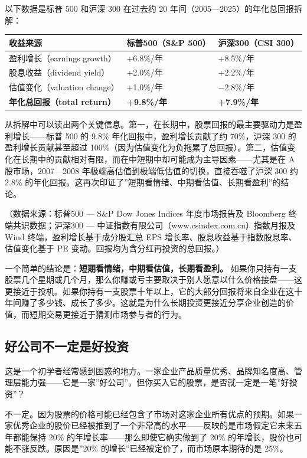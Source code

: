\documentclass[a4paper,11pt,oneside,fontset=none,UTF8,zihao=-4]{ctexbook}
\begin{document}
以下数据是标普 500 和沪深 300 在过去约 20
年间（2005---2025）的年化总回报拆解：

\begin{longtable}[]{@{}lll@{}}
\toprule\noalign{}\rowcolor{dh-pink!25}
收益来源 & 标普500（S\&P 500） & 沪深300（CSI 300） \\
\midrule\noalign{}
\endhead
\bottomrule\noalign{}
\endlastfoot
盈利增长（earnings growth） & +6.8\%/年 & +8.5\%/年 \\
股息收益（dividend yield） & +2.0\%/年 & +2.2\%/年 \\
估值变化（valuation change） & +1.0\%/年 & −2.8\%/年 \\
\textbf{年化总回报（total return）} & \textbf{+9.8\%/年} &
\textbf{+7.9\%/年} \\
\end{longtable}

从拆解中可以读出两个关键信息。第一，在长期中，股票回报的最主要驱动力是盈利增长------标普
500 的 9.8\% 年化回报中，盈利增长贡献了约 70\%，沪深 300
的盈利增长贡献甚至超过
100\%（因为估值变化为负拖累了总回报）。第二，估值变化在长期中的贡献相对有限，而在中短期中却可能成为主导因素------尤其是在
A 股市场，2007---2008 年极端高估值到极端低估值的切换，直接吞噬了沪深 300
约 2.8\%
的年化回报。这再次印证了''短期看情绪、中期看估值、长期看盈利''的结论。

（数据来源：标普500 --- S\&P Dow Jones Indices 年度市场报告及 Bloomberg
终端共识数据；沪深300 ---
中证指数有限公司（www.csindex.com.cn）指数月报及 Wind
终端，盈利增长基于成分股汇总 EPS
增长率、股息收益基于指数股息率、估值变化基于 PE
变动。回报均为含分红再投资的总回报。）

一个简单的结论是：\textbf{短期看情绪，中期看估值，长期看盈利。}
如果你只持有一支股票几个星期或几个月，那么你赚或亏主要取决于别人愿意以什么价格接盘------这更接近于投机。如果你持有一支股票十年以上，它的大部分回报将来自企业在这十年间赚了多少钱、成长了多少。这就是为什么长期投资更接近分享企业创造的价值，而短期交易更接近于猜测市场参与者的行为。

\subsection{好公司不一定是好投资}\label{ux597dux516cux53f8ux4e0dux4e00ux5b9aux662fux597dux6295ux8d44}

这是一个初学者经常感到困惑的地方。一家企业产品质量优秀、品牌知名度高、管理层能力强------它是一家''好公司''。但你买入它的股票，是否就一定是一笔''好投资''？

不一定。因为股票的价格可能已经包含了市场对这家企业所有优点的预期。如果一家优秀企业的股价已经被推到了一个非常高的水平------反映的是市场假定它未来五年都能保持
20\% 的年增长率------那么即使它确实做到了 20\%
的年增长，股价也可能不涨反跌。原因是''20\%
的增长''已经被定价了，而市场原本期待的是 25\%。
\end{document}
